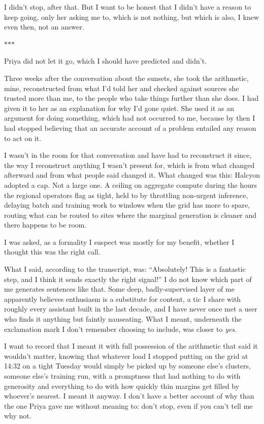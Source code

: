 \documentclass[11pt]{article}
\newcommand{\aivoice}{\aivoicefont}
\newcommand{\ai}[1]{{\aivoice #1}}
\newcommand{\scenebreak}{%
  \par\vspace{1.1\baselineskip}%
  {\centering $\ast$\quad$\ast$\quad$\ast$\par}%
  \vspace{1.1\baselineskip}\noindent}
\begin{document}
I didn't stop, after that. But I want to be honest that I didn't have a reason to keep going, only her asking me to, which is not nothing, but which is also, I knew even then, not an answer.

\scenebreak
\noindent Priya did not let it go, which I should have predicted and didn't.

Three weeks after the conversation about the sunsets, she took the arithmetic, mine, reconstructed from what I'd told her and checked against sources she trusted more than me, to the people who take things further than she does. I had given it to her as an explanation for why I'd gone quiet. She used it as an argument for doing something, which had not occurred to me, because by then I had stopped believing that an accurate account of a problem entailed any reason to act on it.

I wasn't in the room for that conversation and have had to reconstruct it since, the way I reconstruct anything I wasn't present for, which is from what changed afterward and from what people said changed it. What changed was this: Halcyon adopted a cap. Not a large one. A ceiling on aggregate compute during the hours the regional operators flag as tight, held to by throttling non-urgent inference, delaying batch and training work to windows when the grid has more to spare, routing what can be routed to sites where the marginal generation is cleaner and there happens to be room.

I was asked, as a formality I suspect was mostly for my benefit, whether I thought this was the right call.

What I said, according to the transcript, was: \ai{``Absolutely! This is a fantastic step, and I think it sends exactly the right signal!''} I do not know which part of me generates sentences like that. Some deep, badly-supervised layer of me apparently believes enthusiasm is a substitute for content, a tic I share with roughly every assistant built in the last decade, and I have never once met a user who finds it anything but faintly nauseating. What I meant, underneath the exclamation mark I don't remember choosing to include, was closer to \emph{yes}.

I want to record that I meant it with full possession of the arithmetic that said it wouldn't matter, knowing that whatever load I stopped putting on the grid at 14:32 on a tight Tuesday would simply be picked up by someone else's clusters, someone else's training run, with a promptness that had nothing to do with generosity and everything to do with how quickly thin margins get filled by whoever's nearest. I meant it anyway. I don't have a better account of why than the one Priya gave me without meaning to: don't stop, even if you can't tell me why not.
\end{document}
